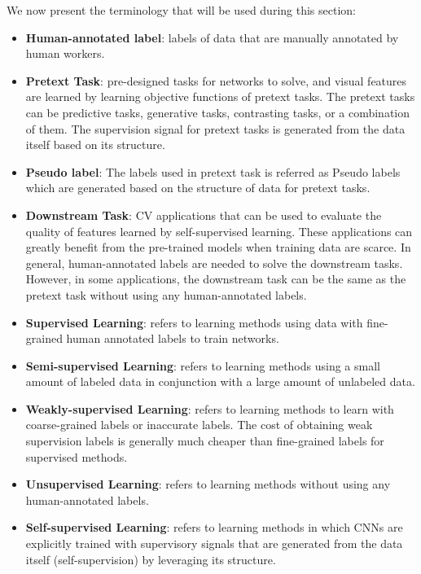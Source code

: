 We now present the terminology that will be used during this section:
\begin{itemize}
      \item \textbf{Human-annotated label}: labels of data that are manually
            annotated by human workers.
      \item \textbf{Pretext Task}: pre-designed tasks for networks to solve, and
            visual features are learned by learning objective functions of pretext
            tasks. The pretext tasks can be predictive tasks, generative tasks,
            contrasting tasks, or a combination of them. The supervision signal
            for pretext tasks is generated from the data itself based on its structure.
      \item \textbf{Pseudo label}: The labels used in pretext task is referred as
            Pseudo labels which are generated based on the structure of data for
            pretext tasks.
      \item \textbf{Downstream Task}: CV applications that can be used to evaluate
            the quality of features learned by self-supervised learning. These
            applications can greatly benefit from the pre-trained models when training
            data are scarce. In general, human-annotated labels are needed to solve
            the downstream tasks. However, in some applications, the downstream task
            can be the same as the pretext task without using any human-annotated
            labels.
      \item \textbf{Supervised Learning}: refers to learning methods using data with
            fine-grained human annotated labels to train networks.
      \item \textbf{Semi-supervised Learning}: refers to learning methods using a
            small amount of labeled data in conjunction with a large amount of
            unlabeled data.
      \item \textbf{Weakly-supervised Learning}: refers to learning methods to learn
            with coarse-grained labels or inaccurate labels. The cost of obtaining
            weak supervision labels is generally much cheaper than fine-grained
            labels for supervised methods.
      \item \textbf{Unsupervised Learning}: refers to learning methods without using
            any human-annotated labels.
      \item \textbf{Self-supervised Learning}: refers to learning methods in which
            CNNs are explicitly trained with supervisory signals that are generated
            from the data itself (self-supervision) by leveraging its structure.
\end{itemize}

